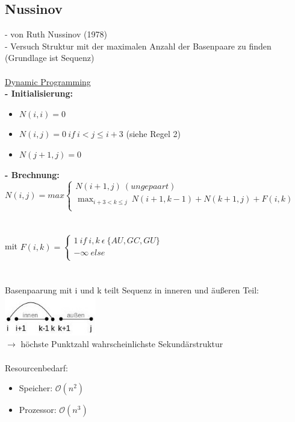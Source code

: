\subsection{Nussinov}
 - von Ruth Nussinov (1978)\\
 - Versuch Struktur mit der maximalen Anzahl der Basenpaare zu finden (Grundlage ist Sequenz)
\\\\
\underline{Dynamic Programming}\\
\textbf{ - Initialisierung:}
\begin{itemize}
	\item $N(i,i) = 0$
	\item $N(i,j)=0\ if\ i<j\le i+3$ (siehe Regel 2)
	\item $N(j+1, j) = 0$
\end{itemize}
\textbf{- Brechnung:}\\
$N(i,j)=max \begin{cases}
               N(i+1, j)\ (ungepaart)\\
               \displaystyle\max_{i+3<k \le j}\ N(i+1, k-1) + N(k+1, j) + F(i,k)\\
\end{cases}$
\\\\\\
mit $F(i,k)= \begin{cases}
               1\ if\ i,k\ \epsilon\ \{AU, GC, GU\}\\
               -\infty\ else\\
\end{cases}$
\\\\\\
Basenpaarung mit i und k teilt Sequenz in inneren und äußeren Teil:\\
\includegraphics[width=0.3\textwidth]{lectures/160404/pix/pairing.jpg}
\\
$\rightarrow$ höchste Punktzahl wahrscheinlichste Sekundärstruktur
\\\\
Resourcenbedarf:
\begin{itemize}
	\item Speicher: $\mathcal{O}(n^2)$
	\item Prozessor: $\mathcal{O}(n^3)$
\end{itemize}